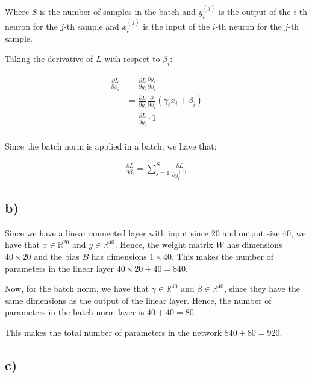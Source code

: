 \documentclass{article}
\begin{document}
Where $S$ is the number of samples in the batch and $y_i^{(j)}$ is the output of the $i$-th neuron for the $j$-th sample
and $x_i^{(j)}$ is the input of the $i$-th neuron for the $j$-th sample.

Taking the derivative of $L$ with respect to $\beta_i$:

\begin{align*}
    \frac{\partial L}{\partial \beta_i} &= \frac{\partial L}{\partial y_i} \frac{\partial y_i}{\partial \beta_i} \\
    &= \frac{\partial L}{\partial y_i} \frac{\partial}{\partial \beta_i} \left( \gamma_i x_i + \beta_i \right) \\
    &= \frac{\partial L}{\partial y_i} \cdot 1 \\
\end{align*}

Since the batch norm is applied in a batch, we have that:

\begin{align*}
    \frac{\partial L}{\partial \beta_i} = \sum_{j=1}^{S} \frac{\partial L}{\partial y_i^{(j)}}
\end{align*}

\newpage
\subsection*{b)}

Since we have a linear connected layer with input since 20 and output size 40, we have that $x \in \mathbb{R}^{20}$ and $y \in \mathbb{R}^{40}$.
Hence, the weight matrix $W$ has dimensions $40 \times 20$ and the bias $B$ has dimensions $1 \times 40$.
This makes the number of parameters in the linear layer $40 \times 20 + 40 = 840$.

Now, for the batch norm, we have that $\gamma \in \mathbb{R}^{40}$ and $\beta \in \mathbb{R}^{40}$, 
since they have the same dimensions as the output of the linear layer. Hence, the number of parameters in the batch norm layer is $40 + 40 = 80$.

This makes the total number of parameters in the network $840 + 80 = 920$.

\newpage
\subsection*{c)}
\end{document}
